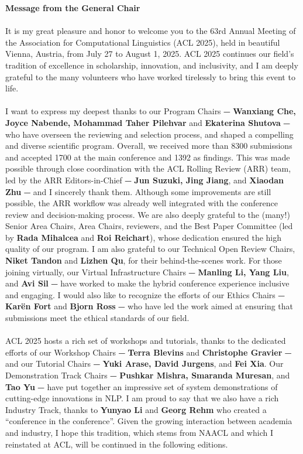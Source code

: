 \textbf{Message from the General Chair}\\
\\

It is my great pleasure and honor to welcome you to the 63rd Annual Meeting of the Association for Computational Linguistics (ACL 2025), held in beautiful Vienna, Austria, from July 27 to August 1, 2025. ACL 2025 continues our field’s tradition of excellence in scholarship, innovation, and inclusivity, and I am deeply grateful to the many volunteers who have worked tirelessly to bring this event to life.\\
\\

I want to express my deepest thanks to our Program Chairs ⏤ \textbf{Wanxiang Che, Joyce Nabende, Mohammad Taher Pilehvar} and \textbf{Ekaterina Shutova} ⏤ who have overseen the reviewing and selection process, and shaped a compelling and diverse scientific program. Overall, we received more than 8300 submissions and accepted 1700 at the main conference and 1392 as findings. This was made possible through close coordination with the ACL Rolling Review (ARR) team, led by the ARR Editors-in-Chief ⏤ \textbf{Jun Suzuki, Jing Jiang}, and \textbf{Xiaodan Zhu} ⏤ and I sincerely thank them. Although some improvements are still possible, the ARR workflow was already well integrated with the conference review and decision-making process. We are also deeply grateful to the (many!) Senior Area Chairs, Area Chairs, reviewers, and the Best Paper Committee (led by \textbf{Rada Mihalcea} and \textbf{Roi Reichart}), whose dedication ensured the high quality of our program. I am also grateful to our Technical Open Review Chairs, \textbf{Niket Tandon} and \textbf{Lizhen Qu}, for their behind-the-scenes work. For those joining virtually, our Virtual Infrastructure Chairs ⏤ \textbf{Manling Li, Yang Liu}, and \textbf{Avi Sil} ⏤ have worked to make the hybrid conference experience inclusive and engaging. I would also like to recognize the efforts of our Ethics Chairs ⏤ \textbf{Karën Fort} and \textbf{Bjorn Ross} ⏤ who have led the work aimed at ensuring that submissions meet the ethical standards of our field. \\
\\

ACL 2025 hosts a rich set of workshops and tutorials, thanks to the dedicated efforts of our Workshop Chairs ⏤ \textbf{Terra Blevins} and \textbf{Christophe Gravier} ⏤ and our Tutorial Chairs ⏤ \textbf{Yuki Arase, David Jurgens}, and \textbf{Fei Xia}. Our Demonstration Track Chairs ⏤ \textbf{Pushkar Mishra, Smaranda Muresan}, and \textbf{Tao Yu} ⏤ have put together an impressive set of system demonstrations of cutting-edge innovations in NLP. I am proud to say that we also have a rich Industry Track, thanks to \textbf{Yunyao Li} and \textbf{Georg Rehm} who created a “conference in the conference”. Given the growing interaction between academia and industry, I hope this tradition, which stems from NAACL and which I reinstated at ACL, will be continued in the following editions.\\
\\

